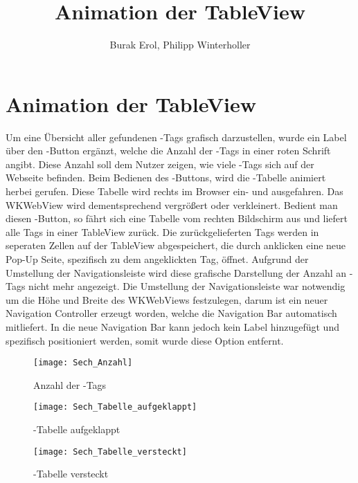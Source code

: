 
\title{Animation der TableView}
\author{Burak Erol, Philipp Winterholler}

\section{Animation der TableView}

Um eine Übersicht aller gefundenen \SEARCH-Tags grafisch darzustellen, wurde ein Label über den \SECH-Button ergänzt, welche die Anzahl der \SEARCH-Tags in einer roten Schrift angibt. Diese Anzahl soll dem Nutzer zeigen, wie viele \SEARCH-Tags sich auf der Webseite befinden. Beim Bedienen des \SECH-Buttons, wird die \SEARCH-Tabelle animiert herbei gerufen. Diese Tabelle wird rechts im Browser ein- und ausgefahren. Das WKWebView wird dementsprechend vergrößert oder verkleinert. Bedient man diesen \SECH-Button, so fährt sich eine Tabelle vom rechten Bildschirm aus und liefert alle Tags in einer TableView zurück. Die zurückgelieferten Tags werden in seperaten Zellen auf der TableView abgespeichert, die durch anklicken eine neue Pop-Up Seite, spezifisch zu dem angeklickten Tag, öffnet. Aufgrund der Umstellung der Navigationsleiste wird diese grafische Darstellung der Anzahl an \SECH-Tags nicht mehr angezeigt. Die Umstellung der Navigationsleiste war notwendig um die Höhe und Breite des WKWebViews festzulegen, darum ist ein neuer Navigation Controller erzeugt worden, welche die Navigation Bar automatisch mitliefert. In die neue Navigation Bar kann jedoch kein Label hinzugefügt und spezifisch positioniert werden, somit wurde diese Option entfernt.

\begin{figure}[h]
	\centering
	\texttt{[image: Sech\_Anzahl]}
	\caption{Anzahl der \SEARCH-Tags}
	\label{fig:Anzahl}
\end{figure}

\begin{figure}[h]
	\centering
	\texttt{[image: Sech\_Tabelle\_aufgeklappt]}
	\caption{\SEARCH-Tabelle aufgeklappt}
	\label{fig:aufgeklappt}
\end{figure}

\begin{figure}[h]
	\centering
	\texttt{[image: Sech\_Tabelle\_versteckt]}
	\caption{\SEARCH-Tabelle versteckt}
	\label{fig:}
\end{figure}
